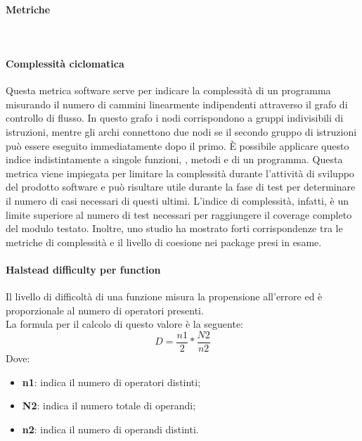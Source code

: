 \documentclass[../NormeDiProgetto.tex]{subfiles}
\begin{document}
			\paragraph{Metriche}\mbox{}\\
			\paragraph{Complessità ciclomatica}
			Questa metrica software serve per indicare la complessità di un programma misurando il numero di cammini linearmente indipendenti attraverso il grafo di controllo di flusso. In questo grafo i nodi corrispondono a gruppi indivisibili di istruzioni, mentre gli archi connettono due nodi se il secondo gruppo di istruzioni può essere eseguito immediatamente dopo il primo. È possibile applicare questo indice indistintamente a singole funzioni, , metodi e  di un programma. Questa metrica viene impiegata per limitare la complessità durante l'attività di sviluppo del prodotto software e può risultare utile durante la fase di test per determinare il numero di casi necessari di questi ultimi. L'indice di complessità, infatti, è un limite superiore al numero di test necessari per raggiungere il coverage completo del modulo testato. Inoltre, uno studio ha mostrato forti corrispondenze tra le metriche di complessità e il livello di coesione nei package presi in esame.\\
			
			\paragraph{Halstead difficulty per function}
				Il livello di difficoltà di una funzione misura la propensione all'errore ed è proporzionale al numero di operatori presenti.\\
				La formula per il calcolo di questo valore è la seguente:
				\begin{equation*}
					D = \frac{n1}{2} * \frac{N2}{n2}
				\end{equation*}
				Dove:
				\begin{itemize}
					\item \textbf{n1}: indica il numero di operatori distinti;
					\item \textbf{N2}: indica il numero totale di operandi;
					\item \textbf{n2}: indica il numero di operandi distinti.
				\end{itemize}
\end{document}
